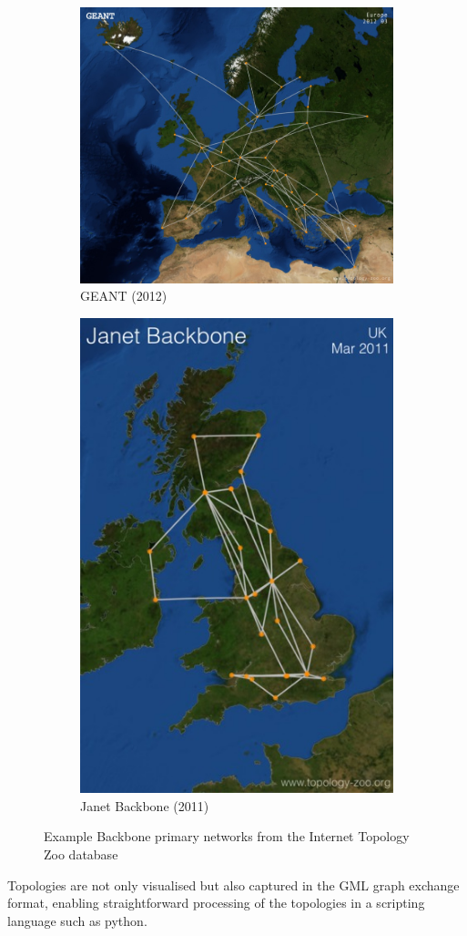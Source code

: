 \begin{figure}
\centering
\begin{subfigure}{.5\textwidth}
    \centering
    \includegraphics[width=0.7\linewidth]{images/real-world/GEANT_2012.jpg}
    \caption{GEANT (2012) \cite{topology_zoo}}
    \label{fig:GEANT}
\end{subfigure}%
\begin{subfigure}{.5\textwidth}
    \centering
    \includegraphics[width=0.5\linewidth]{images/real-world/Janetbackbone_2011.jpg}
    \caption{Janet Backbone (2011) \cite{topology_zoo}}
    \label{fig:janet_backbone}
\end{subfigure}
\caption{Example Backbone primary networks from the Internet Topology Zoo database}
\label{fig:test}
\end{figure}

Topologies are not only visualised but also captured in the GML graph exchange format, enabling straightforward processing of the topologies in a scripting language such as python. 

